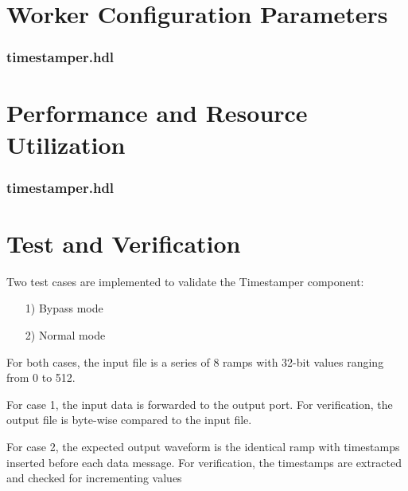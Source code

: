 \documentclass{article}
\def\comp{timestamper}
\edef\ecomp{timestamper}
\def\Comp{Timestamper}
\begin{document}
\begin{landscape}
\section*{Worker Configuration Parameters}
\subsubsection*{\comp.hdl}

\section*{Performance and Resource Utilization}
\subsubsection*{\comp.hdl}

\end{landscape}
\section*{Test and Verification}
\begin{flushleft}
	Two test cases are implemented to validate the \Comp{} component:
	\begin{itemize}
		\item[1)] Bypass mode
		\item[2)] Normal mode
	\end{itemize}
	For both cases, the input file is a series of 8 ramps with 32-bit values ranging from 0 to 512.\par\medskip
	For case 1, the input data is forwarded to the output port. For verification, the output file is byte-wise compared to the input file.\par\medskip
	For case 2,  the expected output waveform is the identical ramp with timestamps inserted before each data message. For verification, the timestamps are extracted and checked for incrementing values
\end{flushleft}
\end{document}
